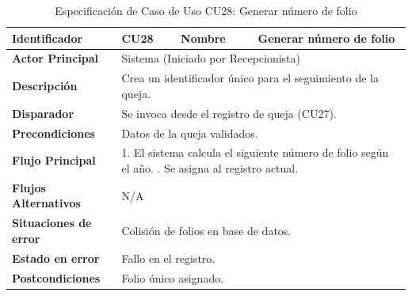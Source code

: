 \begingroup
\setlength{\parskip}{0pt}
\begin{longtable}{|p{3.5cm}|p{2cm}|p{2.5cm}|p{7cm}|}
\caption{Especificación de Caso de Uso CU28: Generar número de folio}
\label{tab:cu28} \\
\hline
\textbf{Identificador} & CU28 & \textbf{Nombre} & Generar número de folio \\ \hline
\textbf{Actor Principal} & \multicolumn{3}{p{11.5cm}|}{Sistema (Iniciado por Recepcionista)} \\ \hline
\textbf{Descripción} & \multicolumn{3}{p{11.5cm}|}{Crea un identificador único para el seguimiento de la queja.} \\ \hline
\textbf{Disparador} & \multicolumn{3}{p{11.5cm}|}{Se invoca desde el registro de queja (CU27).} \\ \hline
\textbf{Precondiciones} & \multicolumn{3}{p{11.5cm}|}{Datos de la queja validados.} \\ \hline
\textbf{Flujo Principal} & \multicolumn{3}{p{11.5cm}|}{1. El sistema calcula el siguiente número de folio según el año. \newline 2. Se asigna al registro actual.} \\ \hline
\textbf{Flujos Alternativos} & \multicolumn{3}{p{11.5cm}|}{N/A} \\ \hline
\textbf{Situaciones de error} & \multicolumn{3}{p{11.5cm}|}{Colisión de folios en base de datos.} \\ \hline
\textbf{Estado en error} & \multicolumn{3}{p{11.5cm}|}{Fallo en el registro.} \\ \hline
\textbf{Postcondiciones} & \multicolumn{3}{p{11.5cm}|}{Folio único asignado.} \\ \hline
\end{longtable}
\endgroup

\vspace{0.8cm}

